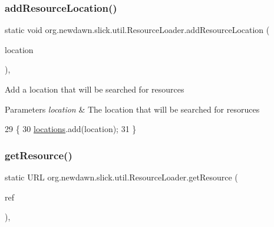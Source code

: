 \subsubsection{\texorpdfstring{add\+Resource\+Location()}{addResourceLocation()}}
{\footnotesize\ttfamily static void org.\+newdawn.\+slick.\+util.\+Resource\+Loader.\+add\+Resource\+Location (\begin{DoxyParamCaption}\item[{\mbox{\hyperlink{interfaceorg_1_1newdawn_1_1slick_1_1util_1_1_resource_location}{Resource\+Location}}}]{location }\end{DoxyParamCaption})\hspace{0.3cm}{\ttfamily [inline]}, {\ttfamily [static]}}

Add a location that will be searched for resources


\begin{DoxyParams}{Parameters}
{\em location} & The location that will be searched for resoruces \\
\hline
\end{DoxyParams}

\begin{DoxyCode}
29                                                                       \{
30         \mbox{\hyperlink{classorg_1_1newdawn_1_1slick_1_1util_1_1_resource_loader_a28036dde216244ec1fb50577d136eac3}{locations}}.add(location);
31     \}
\end{DoxyCode}
\mbox{\label{classorg_1_1newdawn_1_1slick_1_1util_1_1_resource_loader_a5745e07c111bca745914cd4fd5a4929d}} 
\subsubsection{\texorpdfstring{get\+Resource()}{getResource()}}
{\footnotesize\ttfamily static U\+RL org.\+newdawn.\+slick.\+util.\+Resource\+Loader.\+get\+Resource (\begin{DoxyParamCaption}\item[{String}]{ref }\end{DoxyParamCaption})\hspace{0.3cm}{\ttfamily [inline]}, {\ttfamily [static]}}

